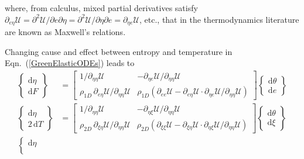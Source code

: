 where, from calculus, mixed partial derivatives satisfy $\partial_{e\eta} \mathcal{U} = \partial^2 \mathcal{U} / \partial e \partial \eta = \partial^2 \mathcal{U} / \partial \eta \partial e = \partial_{\eta e} \mathcal{U}$, etc., that in the thermo\-dynamics literature are known as Maxwell's relations.

Changing cause and effect between entropy and temperature in Eqn.~(\ref{GreenElasticODEs}) leads to
\begin{subequations}
    \label{HelmholtzElasticODEs}
    \begin{align}
    \left\{ \begin{matrix} \mathrm{d} \eta \\ 
    \mathrm{d} F \end{matrix} \right\} & = \begin{bmatrix}
    1/\partial_{\eta\eta} \mathcal{U} & -\partial_{\eta e} \mathcal{U} / 
    \partial_{\eta\eta} \mathcal{U} \\
    \rho_{1D} \, \partial_{e\eta} \mathcal{U} / \partial_{\eta\eta} \mathcal{U} & \rho_{1D} ( \partial_{ee} \mathcal{U} - \partial_{e\eta} \mathcal{U} \!\cdot\! \partial_{\eta e} \mathcal{U} / \partial_{\eta\eta} \mathcal{U} ) \end{bmatrix} 
    \left\{ \begin{matrix} \mathrm{d} \theta \\
    \mathrm{d} e \end{matrix} \right\} \\
    \left\{ \begin{matrix} \mathrm{d} \eta \\ 
    2 \, \mathrm{d} T \end{matrix} \right\} & = \begin{bmatrix}
    1/\partial_{\eta\eta} \mathcal{U} & -\partial_{\eta \xi} \mathcal{U} / \partial_{\eta\eta} \mathcal{U} \\
    \rho_{2D} \, \partial_{\xi\eta} \mathcal{U} / \partial_{\eta\eta} \mathcal{U} & \rho_{2D} ( \partial_{\xi\xi} \mathcal{U} - \partial_{\xi\eta} \mathcal{U} \!\cdot\! \partial_{\eta\xi} \mathcal{U} / \partial_{\eta\eta} \mathcal{U} ) \end{bmatrix} \left\{ \begin{matrix} \mathrm{d} \theta \\
    \mathrm{d} \xi \end{matrix} \right\} \label{HelmholtzMembrane} \\
    \left\{ \begin{matrix} \mathrm{d} \eta \\ 

\end{matrix}
\end{align}
\end{subequations}
